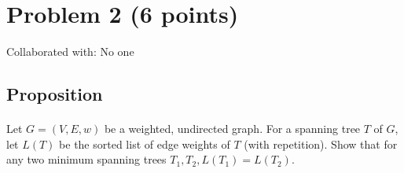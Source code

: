 \documentclass{article}
\begin{document}
\newpage
\section{Problem 2 (6 points)}
Collaborated with: No one

\subsection{Proposition}

\paragraph{\indent}
Let \(G = (V, E, w)\) be a weighted, undirected graph. For a spanning tree \(T\) of \(G\),
let \(L(T)\) be the sorted list of edge weights of \(T\) (with repetition). Show that for
any two minimum spanning trees \(T_1, T_2, L(T_1) = L(T_2)\).
\end{document}

